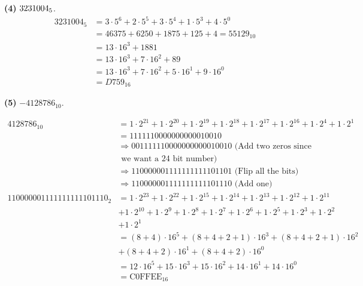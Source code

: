 \documentclass[11pt]{article}
\begin{document}
\noindent \textbf{(4) } $\space 3231004_5$.
\begin{equation}
    \begin{split}
        3231004_5 &= 3 \cdot 5^6 + 2 \cdot 5^5 + 3 \cdot 5^4 + 1 \cdot 5^3 + 4 \cdot 5^0\\
        &= 46375 + 6250 + 1875 + 125 + 4 = 55129_{10}\\
        &= 13 \cdot 16^{3} + 1881\\
        &= 13 \cdot 16^{3} + 7 \cdot 16^{2} + 89\\
        &= 13 \cdot 16^{3} + 7 \cdot 16^{2} + 5 \cdot 16^1 + 9 \cdot 16^0\\
        &= D759_{16}
    \end{split}
\end{equation}
\newpage

\noindent \textbf{(5) } $-4128786_{10}$.

\begin{equation}
    \begin{split}
        4128786_{10} &= 1 \cdot 2^{21} + 1 \cdot 2^{20} +  1 \cdot 2^{19} + 1 \cdot 2^{18} + 1 \cdot 2^{17} + 1  \cdot 2^{16} + 1 \cdot 2^4 + 1 \cdot 2^1 \\
        &= 1111110000000000010010\\
        & \Rightarrow 001111110000000000010010 \text{ (Add two zeros since}\\
        & \text{ we want a 24 bit number)} \\ 
        & \Rightarrow 110000001111111111101101 \text{ (Flip all the bits)} \\
        &\Rightarrow 110000001111111111101110 \text{ (Add one)}\\
        110000001111111111101110_2 &= 1 \cdot 2^{23} + 1 \cdot 2^{22} +1 \cdot 2^{15} + 1 \cdot 2^{14} + 1 \cdot 2^{13} + 1 \cdot 2^{12} + 1 \cdot 2^{11}\\
        & + 1 \cdot 2^{10} + 1 \cdot 2^{9} + 1 \cdot 2^{8} + 1 \cdot 2^{7} + 1 \cdot 2^{6} + 1 \cdot 2^{5} + 1 \cdot 2^{3}+1 \cdot 2^{2}\\
        & + 1 \cdot 2^{1}\\
        &= (8+4) \cdot 16^5 + (8+4+2+1) \cdot 16^3 + (8+4+2+1) \cdot 16^2\\
        & + (8+4+2) \cdot 16^1 + (8 + 4 + 2) \cdot 16^0\\
        &= 12 \cdot 16^5 + 15 \cdot 16^3 + 15 \cdot 16^2 + 14 \cdot 16^1 + 14 \cdot 16^0\\
        &= \text{C0FFEE}_{16}
    \end{split}
\end{equation}
\end{document}

